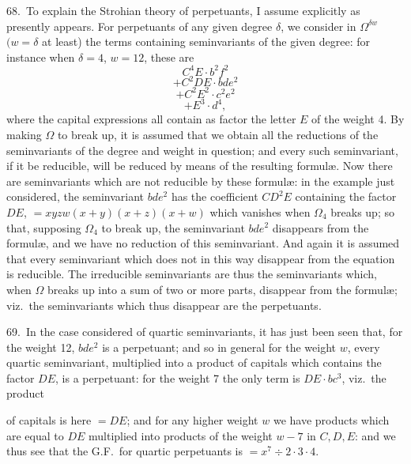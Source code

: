 \documentclass[11pt]{article}
\begin{document}
68.\ To explain the Strohian theory of perpetuants, I assume explicitly as presently appears. For perpetuants of any given degree $\delta$, we consider in $\Omega^{\delta w}$ $(w = \delta$ at least) the terms containing seminvariants of the given degree: for instance when $\delta = 4$, $w = 12$, these are
\[
C^4E \cdot b^2f^2
\]
\[
+ C^2DE \cdot bde^2
\]
\[
+ C^2E^2 \cdot c^2e^2
\]
\[
+ E^3 \cdot d^4,
\]
where the capital expressions all contain as factor the letter $E$ of the weight 4. By making $\Omega$ to break up, it is assumed that we obtain all the reductions of the seminvariants of the degree and weight in question; and every such seminvariant, if it be reducible, will be reduced by means of the resulting formul\ae. Now there are seminvariants which are not reducible by these formul\ae: in the example just considered, the seminvariant $bde^2$ has the coefficient $CD^2E$ containing the factor $DE$, $= xyzw(x + y)(x + z)(x + w)$ which vanishes when $\Omega_4$ breaks up; so that, supposing $\Omega_4$ to break up, the seminvariant $bde^2$ disappears from the formul\ae, and we have no reduction of this seminvariant. And again it is assumed that every seminvariant which does not in this way disappear from the equation is reducible. The irreducible seminvariants are thus the seminvariants which, when $\Omega$ breaks up into a sum of two or more parts, disappear from the formul\ae; viz.\ the seminvariants which thus disappear are the perpetuants.

69.\ In the case considered of quartic seminvariants, it has just been seen that, for the weight 12, $bde^2$ is a perpetuant; and so in general for the weight $w$, every quartic seminvariant, multiplied into a product of capitals which contains the factor $DE$, is a perpetuant: for the weight 7 the only term is $DE \cdot bc^3$, viz.\ the product

\clearpage
of capitals is here $= DE$; and for any higher weight $w$ we have products which are equal to $DE$ multiplied into products of the weight $w - 7$ in $C, D, E$: and we thus see that the G.F.\ for quartic perpetuants is $= x^7 \div 2 \cdot 3 \cdot 4$.
\end{document}
